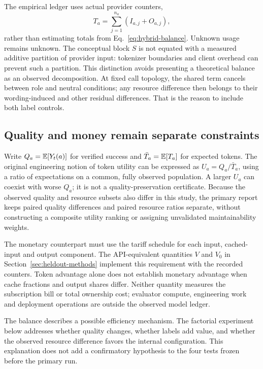 The empirical ledger uses actual provider counters,
\begin{equation}
T_a=\sum_{j=1}^{n_a}(I_{a,j}+O_{a,j}),
\label{eq:hybrid-observed-ledger}
\end{equation}
rather than estimating totals from Eq.~\eqref{eq:hybrid-balance}. Unknown usage remains unknown. The conceptual block $S$ is not equated with a measured additive partition of provider input: tokenizer boundaries and client overhead can prevent such a partition. This distinction avoids presenting a theoretical balance as an observed decomposition. At fixed call topology, the shared term cancels between role and neutral conditions; any resource difference then belongs to their wording-induced and other residual differences. That is the reason to include both label controls.

\subsection{Quality and money remain separate constraints}
Write $Q_a=\mathbb{E}[Y_t(a)]$ for verified success and $\bar T_a=\mathbb{E}[T_a]$ for expected tokens. The original engineering notion of token utility can be expressed as $U_a=Q_a/\bar T_a$, using a ratio of expectations on a common, fully observed population. A larger $U_a$ can coexist with worse $Q_a$; it is not a quality-preservation certificate. Because the observed quality and resource subsets also differ in this study, the primary report keeps paired quality differences and paired resource ratios separate, without constructing a composite utility ranking or assigning unvalidated maintainability weights.

The monetary counterpart must use the tariff schedule for each input, cached-input and output component. The API-equivalent quantities $V$ and $V_0$ in Section~\ref{sec:heldout-methods} implement this requirement with the recorded counters. Token advantage alone does not establish monetary advantage when cache fractions and output shares differ. Neither quantity measures the subscription bill or total ownership cost; evaluator compute, engineering work and deployment operations are outside the observed model ledger.

The balance describes a possible efficiency mechanism. The factorial experiment below addresses whether quality changes, whether labels add value, and whether the observed resource difference favors the internal configuration. This explanation does not add a confirmatory hypothesis to the four tests frozen before the primary run.
